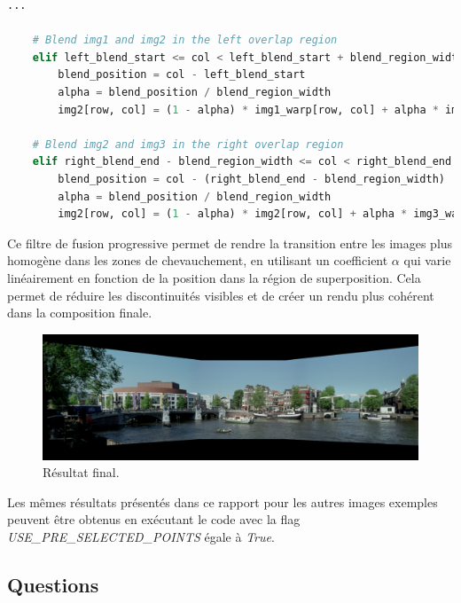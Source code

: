 \documentclass[../5RO17_TP1.tex]{subfiles}
\begin{document}
\begin{scriptsize}\mycode
	\begin{lstlisting}[language=Python]
    ...

    # Blend img1 and img2 in the left overlap region
    elif left_blend_start <= col < left_blend_start + blend_region_width:
        blend_position = col - left_blend_start
        alpha = blend_position / blend_region_width
        img2[row, col] = (1 - alpha) * img1_warp[row, col] + alpha * img2[row, col]

    # Blend img2 and img3 in the right overlap region
    elif right_blend_end - blend_region_width <= col < right_blend_end:
        blend_position = col - (right_blend_end - blend_region_width)
        alpha = blend_position / blend_region_width
        img2[row, col] = (1 - alpha) * img2[row, col] + alpha * img3_warp[row, col]
	\end{lstlisting}
\end{scriptsize}

Ce filtre de fusion progressive permet de rendre la transition entre les images plus homogène dans les zones de chevauchement, en utilisant un coefficient \(\alpha\) qui varie linéairement en fonction de la position dans la région de superposition. Cela permet de réduire les discontinuités visibles et de créer un rendu plus cohérent dans la composition finale. 

\begin{figure}[h]
    \centering
    \includegraphics[width=1\linewidth]{images/amsterdam_final.png}
    \caption{Résultat final.}
    \label{fig:ams3}
\end{figure}

Les mêmes résultats présentés dans ce rapport pour les autres images exemples peuvent être obtenus en exécutant le code avec la flag \textit{USE\_PRE\_SELECTED\_POINTS} égale à \textit{True}.

\subsection{Questions}
\end{document}
